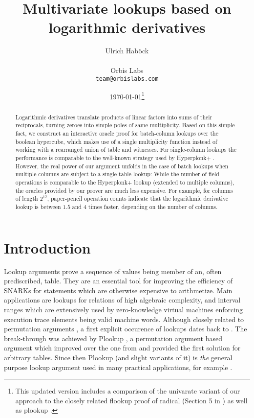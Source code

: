 \documentclass[11pt]{article}
\author{%
Ulrich Hab{\"o}ck
\\\\
Orbis Labs
\\
\texttt{team@orbislabs.com}
}
\theoremstyle{definition}
\theoremstyle{remark}
\begin{document}
\title{%
Multivariate lookups based on
logarithmic derivatives
}
\date{%
\today\footnote{%
This updated version includes a comparison of the univarate variant of our approach to the closely related flookup proof of radical  (Section 5 in \cite{flookup}) as well as plookup \cite{Plookup}.
}
}
\maketitle


\begin{abstract}
Logarithmic derivatives translate products of linear factors into sums of their reciprocals, turning zeroes into simple poles of same multiplicity.
Based on this simple fact, we construct an interactive oracle proof for batch-column lookups over the boolean hypercube, which makes use of a single multiplicity function instead of working with a rearranged union of table and witnesses.
For single-column lookups the performance is comparable to the well-known \cite{Plookup} strategy used by Hyperplonk+ \cite{Hyperplonk}.
However, the real power of our argument unfolds in the case of batch lookups when multiple columns are subject to a single-table lookup:  
While the number of field operations is comparable to the Hyperplonk+ lookup (extended to multiple columns), the oracles provided by our prover are much less expensive. 
For example, for columns of length $2^{12}$, paper-pencil operation counts indicate that the logarithmic derivative lookup is between $1.5$ and $4$ times faster, depending on the number of columns.
\end{abstract}


 \tableofcontents

\section{Introduction}

Lookup arguments prove a sequence of values being member of an, often prediscribed, table. 
They are an essential tool for improving the efficiency of SNARKs for statements which are otherwise expensive to arithmetize. 
Main applications are lookups for relations of high algebraic complexity, and interval ranges which are extensively used by zero-knowledge virtual machines enforcing execution trace elements being valid machine words.
Although closely related to permutation arguments \cite{shuffle, RAMs}, a first explicit occurence of lookups dates back to \cite{Arya}.
The break-through was achieved by Plookup \cite{Plookup}, a permutation argument based argument which improved over the one from \cite{Arya} and provided the first solution for arbitrary tables. 
Since then Plookup (and slight variants of it) is \textit{the} general purpose lookup argument used in many practical applications, for example \cite{Aztek, Halo2, Arkworks, Cairo, Miden}. 
\end{document}
